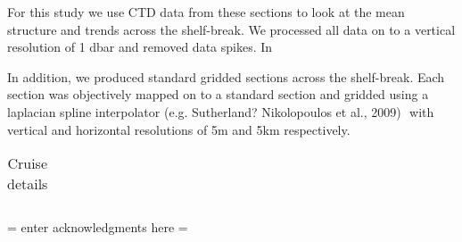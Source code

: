 \documentclass[draft,linenumbers]{agujournal}
\begin{document}
For this study we use CTD data from these sections to look at the mean structure and trends across the shelf-break. We processed all data on to a vertical resolution of 1 dbar and removed data spikes. In

In addition, we produced standard gridded sections across the shelf-break. Each section was objectively mapped on to a standard section and gridded using a laplacian spline interpolator (e.g. Sutherland? Nikolopoulos et al., 2009)  with vertical and horizontal resolutions of 5m and 5km respectively.


\begin{table}[!ht]
\caption{Cruise details}
\centering
\begin{tabular}{c c c c c c c l}
\hline

\hline
\end{tabular}
\end{table}




\acknowledgments
 = enter acknowledgments here =


\end{document}
